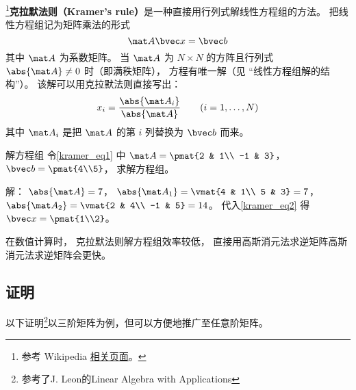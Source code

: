 
\begin{issues}
\issueTODO
\end{issues}


\footnote{参考 Wikipedia \href{https://en.wikipedia.org/wiki/Cramer's_rule}{相关页面}。}\textbf{克拉默法则（Kramer's rule）}是一种直接用行列式解线性方程组的方法。 把线性方程组记为矩阵乘法的形式
\begin{equation}\label{kramer_eq1}
\mat A \bvec x = \bvec b
\end{equation}
其中 $\mat A$ 为系数矩阵。 当 $\mat A$ 为 $N\times N$ 的方阵且行列式 $\abs{\mat A} \ne 0$ 时（即满秩矩阵）， 方程有唯一解（见 “线性方程组解的结构”）。 该解可以用克拉默法则直接写出：
\begin{equation}\label{kramer_eq2}
x_i = \frac{\abs{\mat A_i}}{\abs{\mat A}} \qquad (i = 1, \dots, N)
\end{equation}
其中 $\mat A_i$ 是把 $\mat A$ 的第 $i$ 列替换为 $\bvec b$ 而来。

\begin{example}{解方程组}
令\autoref{kramer_eq1} 中 $\mat A = \pmat{2 & 1\\ -1 & 3}$， $\bvec b = \pmat{4\\5}$， 求解方程组。

解： $\abs{\mat A} = 7$， $\abs{\mat A_1} = \vmat{4 & 1\\ 5 & 3} = 7$， $\abs{\mat A_2} = \vmat{2 & 4\\ -1 & 5} = 14$。 代入\autoref{kramer_eq2} 得 $\bvec x = \pmat{1\\2}$。
\end{example}

在数值计算时， 克拉默法则解方程组效率较低， 直接用高斯消元法求逆矩阵高斯消元法求逆矩阵会更快。

\subsection{证明}
以下证明\footnote{参考了J. Leon的Linear Algebra with Applications}以三阶矩阵为例，但可以方便地推广至任意阶矩阵。

